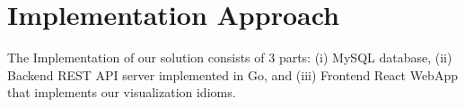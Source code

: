 \section{Implementation Approach}

The Implementation of our solution consists of 3 parts: (i) MySQL database, (ii) Backend REST API
server implemented in Go, and (iii) Frontend React WebApp that implements our visualization idioms.